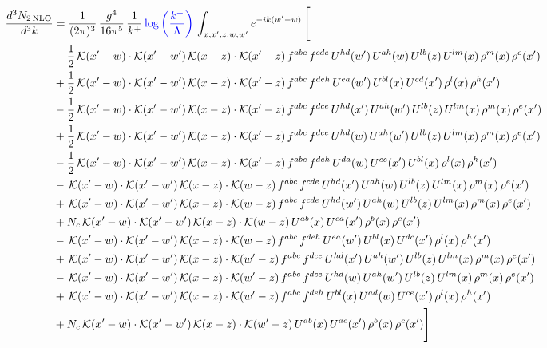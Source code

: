 \documentclass[9pt]{article}
\numberwithin{equation}{section}
\begin{document}
\begin{align}
\frac{d^{3}N_{2\,\mathrm{NLO}}}{d^{3}k} & = \frac{1}{(2\pi)^{3}}\,\frac{g^{4}}{16\pi^{5}}\,\frac{1}{k^{+}}\,{\color{blue}\log{\left(\frac{k^{+}}{\Lambda}\right)}}\,\int_{x,x',z,w,w'}e^{-ik(w'-w)}\,\Bigg[\notag\\ & -\frac{1}{2}\,\mathcal{K}(x'-w)\cdot\mathcal{K}(x'-w')\,\mathcal{K}(x-z)\cdot\mathcal{K}(x'-z)\,f^{abc}\,f^{cde}\,U^{hd}(w')\,U^{ah}(w)\,U^{lb}(z)\,U^{lm}(x)\,\rho^{m}(x)\,\rho^{e}(x')\notag\\
& +\frac{1}{2}\,\mathcal{K}(x'-w)\cdot\mathcal{K}(x'-w')\,\mathcal{K}(x-z)\cdot\mathcal{K}(x'-z)\,f^{abc}\,f^{deh}\,U^{ea}(w')\,U^{bl}(x)\,U^{cd}(x')\,\rho^{l}(x)\,\rho^{h}(x')\notag\\
& -\frac{1}{2}\,\mathcal{K}(x'-w)\cdot\mathcal{K}(x'-w')\,\mathcal{K}(x-z)\cdot\mathcal{K}(x'-z)\,f^{abc}\,f^{dce}\,U^{hd}(x')\,U^{ah}(w')\,U^{lb}(z)\,U^{lm}(x)\,\rho^{m}(x)\,\rho^{e}(x')\notag\\
& +\frac{1}{2}\,\mathcal{K}(x'-w)\cdot\mathcal{K}(x'-w')\,\mathcal{K}(x-z)\cdot\mathcal{K}(x'-z)\,f^{abc}\,f^{dce}\,U^{hd}(w)\,U^{ah}(w')\,U^{lb}(z)\,U^{lm}(x)\,\rho^{m}(x)\,\rho^{e}(x')\notag\\
& -\frac{1}{2}\,\mathcal{K}(x'-w)\cdot\mathcal{K}(x'-w')\,\mathcal{K}(x-z)\cdot\mathcal{K}(x'-z)\,f^{abc}\,f^{deh}\,U^{da}(w)\,U^{ce}(x')\,U^{bl}(x)\,\rho^{l}(x)\,\rho^{h}(x')\notag\\
& -\,\mathcal{K}(x'-w)\cdot\mathcal{K}(x'-w')\,\mathcal{K}(x-z)\cdot\mathcal{K}(w-z)\,f^{abc}\,f^{cde}\,U^{hd}(x')\,U^{ah}(w)\,U^{lb}(z)\,U^{lm}(x)\,\rho^{m}(x)\,\rho^{e}(x') \notag \\ &  +\,\mathcal{K}(x'-w)\cdot\mathcal{K}(x'-w')\,\mathcal{K}(x-z)\cdot\mathcal{K}(w-z)\,f^{abc}\,f^{cde}\,U^{hd}(w')\,U^{ah}(w)\,U^{lb}(z)\,U^{lm}(x)\,\rho^{m}(x)\,\rho^{e}(x')\notag\\
& +N_{c}\,\mathcal{K}(x'-w)\cdot\mathcal{K}(x'-w')\,\mathcal{K}(x-z)\cdot\mathcal{K}(w-z)\,U^{ab}(x)\,U^{ca}(x')\,\rho^{b}(x)\,\rho^{c}(x')\notag\\
& -\,\mathcal{K}(x'-w)\cdot\mathcal{K}(x'-w')\,\mathcal{K}(x-z)\cdot\mathcal{K}(w-z)\,f^{abc}\,f^{deh}\,U^{ea}(w')\,U^{bl}(x)\,U^{dc}(x')\,\rho^{l}(x)\,\rho^{h}(x')\notag\\
& +\,\mathcal{K}(x'-w)\cdot\mathcal{K}(x'-w')\,\mathcal{K}(x-z)\cdot\mathcal{K}(w'-z)\,f^{abc}\,f^{dce}\,U^{hd}(x')\,U^{ah}(w')\,U^{lb}(z)\,U^{lm}(x)\,\rho^{m}(x)\,\rho^{e}(x')\notag\\
& -\,\mathcal{K}(x'-w)\cdot\mathcal{K}(x'-w')\,\mathcal{K}(x-z)\cdot\mathcal{K}(w'-z)\,f^{abc}\,f^{dce}\,U^{hd}(w)\,U^{ah}(w')\,U^{lb}(z)\,U^{lm}(x)\,\rho^{m}(x)\,\rho^{e}(x')\notag\\
& +\,\mathcal{K}(x'-w)\cdot\mathcal{K}(x'-w')\,\mathcal{K}(x-z)\cdot\mathcal{K}(w'-z)\,f^{abc}\,f^{deh}\,U^{bl}(x)\,U^{ad}(w)\,U^{ce}(x')\,\rho^{l}(x)\,\rho^{h}(x')\notag\\
& +N_{c}\,\mathcal{K}(x'-w)\cdot\mathcal{K}(x'-w')\,\mathcal{K}(x-z)\cdot\mathcal{K}(w'-z)\,U^{ab}(x)\,U^{ac}(x')\,\rho^{b}(x)\,\rho^{c}(x')\Bigg]
\end{align}
\end{document}
